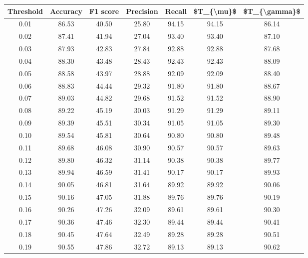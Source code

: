 \begin{tabular}{|c|c|c|c|c|c|c|}
\hline
 Threshold &  Accuracy &  F1 score &  Precision &  Recall &  \$T\_\{\textbackslash mu\}\$ &  \$T\_\{\textbackslash gamma\}\$ \\
\hline
      0.01 &     86.53 &     40.50 &      25.80 &   94.15 &      94.15 &         86.14 \\
      0.02 &     87.41 &     41.94 &      27.04 &   93.40 &      93.40 &         87.10 \\
      0.03 &     87.93 &     42.83 &      27.84 &   92.88 &      92.88 &         87.68 \\
      0.04 &     88.30 &     43.48 &      28.43 &   92.43 &      92.43 &         88.09 \\
      0.05 &     88.58 &     43.97 &      28.88 &   92.09 &      92.09 &         88.40 \\
      0.06 &     88.83 &     44.44 &      29.32 &   91.80 &      91.80 &         88.67 \\
      0.07 &     89.03 &     44.82 &      29.68 &   91.52 &      91.52 &         88.90 \\
      0.08 &     89.22 &     45.19 &      30.03 &   91.29 &      91.29 &         89.11 \\
      0.09 &     89.39 &     45.51 &      30.34 &   91.05 &      91.05 &         89.30 \\
      0.10 &     89.54 &     45.81 &      30.64 &   90.80 &      90.80 &         89.48 \\
      0.11 &     89.68 &     46.08 &      30.90 &   90.57 &      90.57 &         89.63 \\
      0.12 &     89.80 &     46.32 &      31.14 &   90.38 &      90.38 &         89.77 \\
      0.13 &     89.94 &     46.59 &      31.41 &   90.17 &      90.17 &         89.93 \\
      0.14 &     90.05 &     46.81 &      31.64 &   89.92 &      89.92 &         90.06 \\
      0.15 &     90.16 &     47.05 &      31.88 &   89.76 &      89.76 &         90.19 \\
      0.16 &     90.26 &     47.26 &      32.09 &   89.61 &      89.61 &         90.30 \\
      0.17 &     90.36 &     47.46 &      32.30 &   89.44 &      89.44 &         90.41 \\
      0.18 &     90.45 &     47.64 &      32.49 &   89.28 &      89.28 &         90.51 \\
      0.19 &     90.55 &     47.86 &      32.72 &   89.13 &      89.13 &         90.62 \\

\end{tabular}
